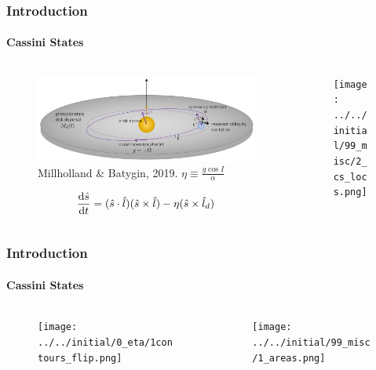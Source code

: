 \documentclass[dvipsnames]{beamer}
\newcommand*{\rd}[2]{\frac{\mathrm{d}#1}{\mathrm{d}#2}}
\DeclarePairedDelimiter\p{\lparen}{\rparen}
\begin{document}
\begin{frame}
    \frametitle{Introduction}
    \framesubtitle{Cassini States}

    \begin{columns}
        \begin{column}{0.5\textwidth}
            \begin{figure}
                \centering
                \includegraphics[width=\textwidth]{../GM_190913/1millholland_disk.png}
                \caption{Millholland \& Batygin, 2019. $\eta \equiv \frac{g\cos
                I}{\alpha}$}
            \end{figure}
            \begin{equation*}
                \rd{\hat{s}}{t}
                    = \p{\hat{s} \cdot \hat{l}}
                        \p{\hat{s} \times \hat{l}}
                    - \eta\p{\hat{s} \times \hat{l}_d}
            \end{equation*}
        \end{column}
        \begin{column}{0.5\textwidth}
            \begin{figure}
                \centering
                \texttt{[image: ../../initial/99\_misc/2\_cs\_locs.png]}
            \end{figure}
        \end{column}
    \end{columns}
\end{frame}

\begin{frame}
    \frametitle{Introduction}
    \framesubtitle{Cassini States}

    \begin{columns}
        \begin{column}{0.5\textwidth}
            \begin{figure}
                \centering
                \texttt{[image: ../../initial/0\_eta/1contours\_flip.png]}
            \end{figure}
        \end{column}
        \begin{column}{0.5\textwidth}
            \begin{figure}
                \centering
                \texttt{[image: ../../initial/99\_misc/1\_areas.png]}
            \end{figure}
        \end{column}
    \end{columns}
\end{frame}
\end{document}
